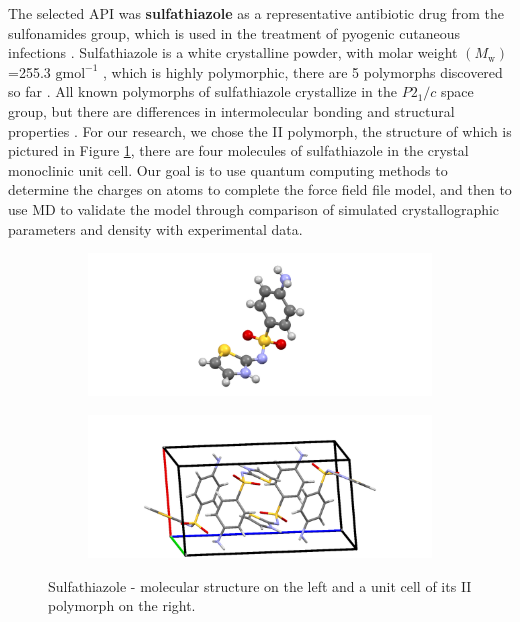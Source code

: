     The selected API was \textbf{sulfathiazole} as a representative antibiotic drug from the sulfonamides group, which is used in the treatment of pyogenic cutaneous infections \cite{sulfathiazole_usage}. Sulfathiazole is a white crystalline powder, with molar weight $(M_\mathrm{w})$ =255.3 $\mathrm{gmol^{-1}}$ \cite{sulfathiazole}, which is highly polymorphic, there are 5 polymorphs discovered so far \cite{caron}. All known polymorphs of sulfathiazole crystallize in the $P2_1/c$ space group, but there are differences in intermolecular bonding and structural properties \cite{sulfathiazole_exp}. For our research, we chose the II polymorph, the structure of which is pictured in Figure \ref{fig:sulfathiazole}, there are four molecules of sulfathiazole in the crystal monoclinic unit cell. Our goal is to use quantum computing methods to determine the charges on atoms to complete the force field file model, and then to use MD to validate the model through comparison of simulated crystallographic parameters and density with experimental data.

    \begin{figure}[htb!]
	\begin{subfigure}{0.5\textwidth}
		\includegraphics[width=1.2\linewidth]{img/sulfathiazol.png} 
	\end{subfigure}
	\begin{subfigure}{0.5\textwidth}
		\includegraphics[width=1.1\linewidth]{img/sulfathiazol_packing.png}
	\end{subfigure}
	\caption{Sulfathiazole - molecular structure on the left and a unit cell of its II polymorph on the right.}
	\label{fig:sulfathiazole}
\end{figure}
